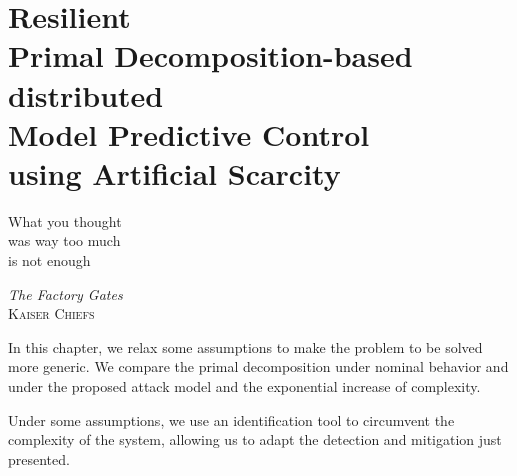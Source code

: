 \documentclass[../main.tex]{subfiles}
\begin{document}
\chapter[Resilient Primal Decomposition-based dMPC using Artificial Scarcity]{Resilient \\Primal Decomposition-based \\distributed \\Model Predictive Control\\using Artificial Scarcity}\label{sec:safe_pddmpc_ineq}
\epigraph{\centering What you thought\\ was way too much\\ is not enough}
{\textit{The Factory Gates}\\\textsc{Kaiser Chiefs}}

In this chapter, we relax some assumptions to make the problem to be solved more generic.
We compare the primal decomposition under nominal behavior and under the proposed attack model and the exponential increase of complexity.

Under some assumptions, we use an identification tool to circumvent the complexity of the system, allowing us to adapt the detection and mitigation just presented.

\minitoc
\end{document}
